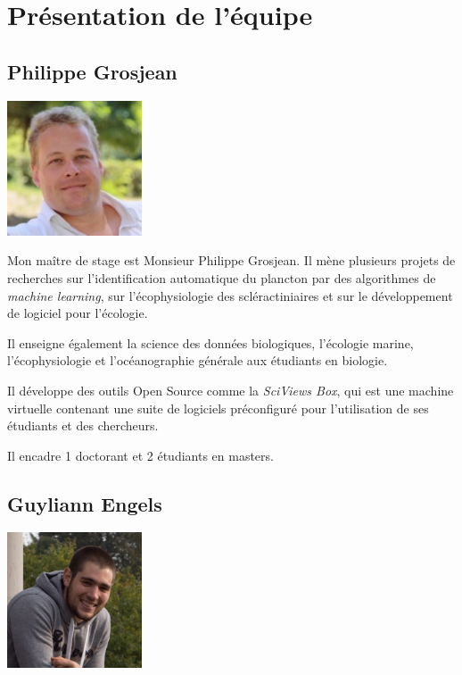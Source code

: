 \documentclass[]{report}
\begin{document}
\section{Présentation de l'équipe}\label{presentation-de-lequipe}

\subsection{Philippe Grosjean}\label{philippe-grosjean}

\includegraphics[width=4.00000cm]{../image/Grosjean2.jpg}

Mon maître de stage est Monsieur Philippe Grosjean. Il mène plusieurs
projets de recherches sur l'identification automatique du plancton par
des algorithmes de \emph{machine learning}, sur l'écophysiologie des
scléractiniaires et sur le développement de logiciel pour l'écologie.

Il enseigne également la science des données biologiques, l'écologie
marine, l'écophysiologie et l'océanographie générale aux étudiants en
biologie.

Il développe des outils Open Source comme la \emph{SciViews Box}, qui
est une machine virtuelle contenant une suite de logiciels préconfiguré
pour l'utilisation de ses étudiants et des chercheurs.

Il encadre 1 doctorant et 2 étudiants en masters.

\subsection{Guyliann Engels}\label{guyliann-engels}

\includegraphics[width=4.00000cm]{../image/Guyliann.jpg}
\end{document}
